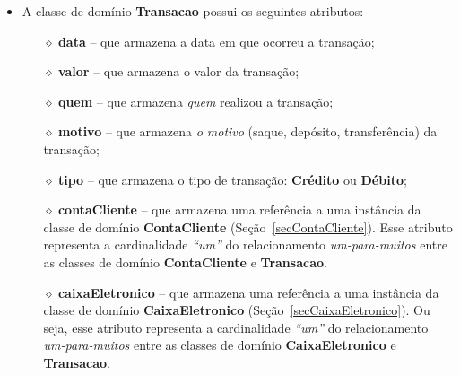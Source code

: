 \begin{itemize}

\item A classe de domínio {\bf Transacao} possui os seguintes atributos:

\vspace{0.3cm}

\begin{itemize}

\item[$\diamond$] {\bf data} -- que armazena a data em que ocorreu a transação; 

\vspace{0.3cm}

\item[$\diamond$] {\bf valor} -- que armazena o valor da transação; 

\vspace{0.3cm}

\item[$\diamond$] {\bf quem} -- que armazena {\em quem} realizou a transação; 

\vspace{0.3cm}

\item[$\diamond$] {\bf motivo} -- que  armazena {\em o motivo} (saque, depósito,
  transferência) da transação;

\vspace{0.3cm}

\item[$\diamond$] {\bf tipo} -- que  armazena o tipo de transação: {\bf Crédito}
  ou {\bf Débito};

\vspace{0.3cm}

\item[$\diamond$]  {\bf  contaCliente} --  que  armazena  uma  referência a  uma
  instância      da      classe      de     domínio      {\bf      ContaCliente}
  (Seção~\ref{secContaCliente}).  Esse atributo  representa a cardinalidade {\em
    ``um''} do  relacionamento {\em um-para-muitos} entre as  classes de domínio
  {\bf ContaCliente} e {\bf Transacao}.

\vspace{0.3cm}

\item[$\diamond$]  {\bf caixaEletronico} --  que armazena  uma referência  a uma
  instância     da      classe     de     domínio      {\bf     CaixaEletronico}
  (Seção~\ref{secCaixaEletronico}).   Ou   seja,  esse  atributo   representa  a
  cardinalidade  {\em ``um''}  do relacionamento  {\em um-para-muitos}  entre as
  classes de domínio {\bf CaixaEletronico} e {\bf Transacao}.

\end{itemize}

\end{itemize}


